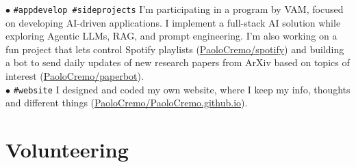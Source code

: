 \documentclass[letterpaper]{twentysecondcv} %
\begin{document}
$\bullet$ \texttt{\#appdevelop \#sideprojects} %
          {\small 
          I'm participating in a program by VAM, focused on developing AI-driven applications. I implement a full-stack AI solution while exploring Agentic LLMs, RAG, and prompt engineering. %
          I'm also working on a fun project that lets control Spotify playlists (\href{https://github.com/PaoloCremo/spotify}{PaoloCremo/spotify}) and building a bot to send daily updates of new research papers from ArXiv based on topics of interest (\href{https://github.com/PaoloCremo/paperbot}{PaoloCremo/paperbot}).
          }\\
$\bullet$ \texttt{\#website}   
          {\small I designed and coded my own website, where I keep my info, thoughts and different things (\href{https://github.com/PaoloCremo/PaoloCremo.github.io}{PaoloCremo/PaoloCremo.github.io}).}



% 


\section{Volunteering}
\end{document}
